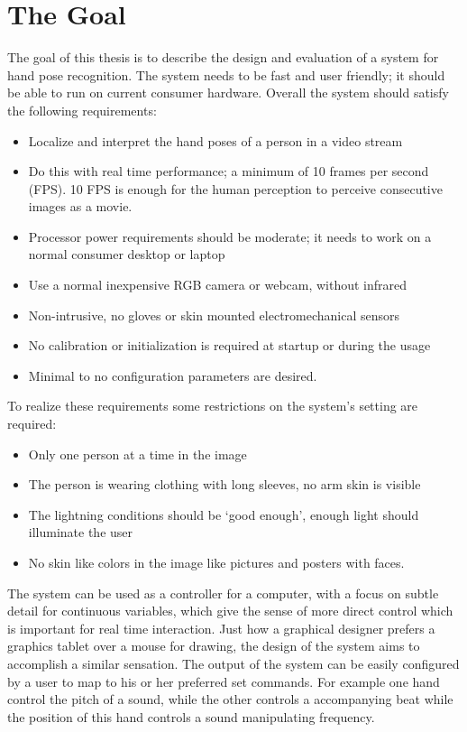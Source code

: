 \section{The Goal}
\label{sec:goal}
The goal of this thesis is to describe the design and evaluation of a system for hand pose recognition. The system needs to be fast and user friendly; it should be able to run on current consumer hardware. Overall the system should satisfy the following requirements:

\begin{itemize}
	\item Localize and interpret the hand poses of a person in a video stream
	\item Do this with real time performance; a minimum of 10 frames per second (FPS). 10 FPS is enough for the human perception to perceive consecutive images as a movie. 
	\item Processor power requirements should be moderate; it needs to work on a normal consumer desktop or laptop
	\item Use a normal inexpensive RGB camera or webcam, without infrared
	\item Non-intrusive, no gloves or skin mounted electromechanical sensors
	\item No calibration or initialization is required at startup or during the usage
	\item Minimal to no configuration parameters are desired.
\end{itemize}
	
To realize these requirements some restrictions on the system's setting are required:

\begin{itemize}
	\item Only one person at a time in the image
	\item The person is wearing clothing with long sleeves, no arm skin is visible
	\item The lightning conditions should be `good enough', enough light should illuminate the user
	\item No skin like colors in the image like pictures and posters with faces.
\end{itemize}

The system can be used as a controller for a computer, with a focus on subtle detail for continuous variables, which give the sense of more direct control which is important for real time interaction. Just how a graphical designer prefers a graphics tablet over a mouse for drawing, the design of the system aims to accomplish a similar sensation. The output of the system can be easily configured by a user to map to his or her preferred set commands. For example one hand control the pitch of a sound, while the other controls a accompanying beat while the position of this hand controls a sound manipulating frequency.

